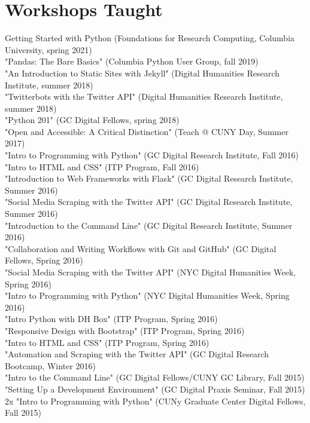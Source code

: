\documentclass[11pt]{article}
\begin{document}
\section*{Workshops Taught}
\label{sec:orgheadline11}
Getting Started with Python (Foundations for Research Computing, Columbia University, spring 2021)\\
"Pandas: The Bare Basics" (Columbia Python User Group, fall 2019)\\
"An Introduction to Static Sites with Jekyll" (Digital Humanities Research Institute, summer 2018)\\
"Twitterbots with the Twitter API" (Digital Humanities Research Institute, summer 2018)\\
"Python 201" (GC Digital Fellows, spring 2018)\\
"Open and Accessible: A Critical Distinction" (Teach @ CUNY Day, Summer 2017)\\
"Intro to Programming with Python" (GC Digital Research Institute, Fall 2016)\\
"Intro to HTML and CSS" (ITP Program, Fall 2016)\\
"Introduction to Web Frameworks with Flask" (GC Digital Research Institute, Summer 2016)\\
"Social Media Scraping with the Twitter API" (GC Digital Research Institute, Summer 2016)\\
"Introduction to the Command Line" (GC Digital Research Institute, Summer 2016)\\
"Collaboration and Writing Workflows with Git and GitHub" (GC Digital Fellows, Spring 2016)\\
"Social Media Scraping with the Twitter API" (NYC Digital Humanities Week, Spring 2016)\\
"Intro to Programming with Python" (NYC Digital Humanities Week, Spring 2016)\\
"Intro Python with DH Box" (ITP Program, Spring 2016)\\
"Responsive Design with Bootstrap" (ITP Program, Spring 2016)\\
"Intro to HTML and CSS" (ITP Program, Spring 2016)\\
"Automation and Scraping with the Twitter API" (GC Digital Research Bootcamp, Winter 2016)\\
"Intro to the Command Line" (GC Digital Fellows/CUNY GC Library, Fall 2015)\\
"Setting Up a Development Environment" (GC Digital Praxis Seminar, Fall 2015)\\
2x "Intro to Programming with Python" (CUNy Graduate Center Digital Fellows, Fall 2015)\\
\end{document}
